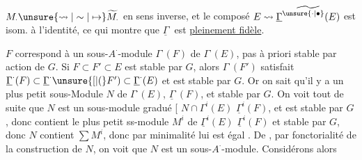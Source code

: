 $M_{\cdot}\unsure{\leadsto|\sim|\mapsto}\widetilde M_{\cdot}$ en sens inverse,  et le composé 
$E\leadsto\widetilde{\underline{\Gamma}^{\unsure{\cdot|\bullet}}(E)}$ est isom. à l'identité, ce qui
montre que $\underline{\Gamma}^{\cdot}$ est \uline{pleinement fidèle}.

$F$ correspond à un sous-$A^{\cdot}$-module
$\Gamma^{\cdot}(F)$ de $\Gamma^{\cdot}(E)$, pas à priori stable par action
de $G$. Si   $F\subset F'\subset E$ 
 est stable par $G$, alors $\Gamma^{\cdot}(F')$
 satisfait
$\underline{\Gamma}^{\cdot}(F)\subset\underline{\Gamma}^{\cdot}\unsure{[|(}F')\subset\underline{\Gamma}^{\cdot}(E)$ et est stable par $G$.
Or on sait qu'il y a un plus petit
sous-Module $N$ de $\Gamma^{\cdot}(E)$, 
$\underline{\Gamma}^{\cdot}(F)$, et stable par $G$. On voit tout de
suite que $N$ est un sous-module gradué
[   $N\cap\Gamma^i(E)$  $\underline{\Gamma}^i(F)$, et
est stable par $G$, donc contient le plus
petit ss-module $M^i$ de $\underline{\Gamma}^i(E)$ 
$\underline{\Gamma}^i(F)$ et stable par $G$, donc $N$ contient
$\sum M^i$, donc par minimalité lui est
égal \unsure{]|$\}$|?]}. De , par fonctorialité de la
construction de $N$, on voit que $N$ est
un sous-$A^\cdot$-module. Considérons alors
